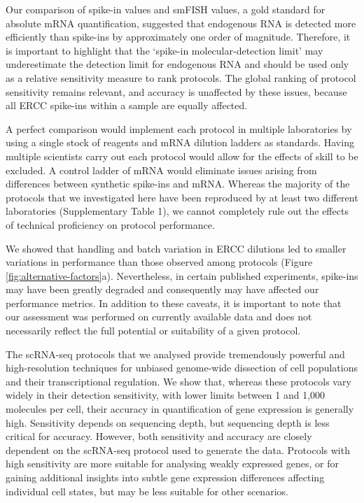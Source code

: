 Our comparison of spike-in values and smFISH values, a gold standard for absolute mRNA quantification, suggested that endogenous RNA is detected more efficiently than spike-ins by approximately one order of magnitude. Therefore, it is important to highlight that the ‘spike-in molecular-detection limit’ may underestimate the detection limit for endogenous RNA and should be used only as a relative sensitivity measure to rank protocols. The global ranking of protocol sensitivity remains relevant, and accuracy is unaffected by these issues, because all ERCC spike-ins within a sample are equally affected.

A perfect comparison would implement each protocol in multiple laboratories by using a single stock of reagents and mRNA dilution ladders as standards. Having multiple scientists carry out each protocol would allow for the effects of skill to be excluded. A control ladder of mRNA would eliminate issues arising from differences between synthetic spike-ins and mRNA. Whereas the majority of the protocols that we investigated here have been reproduced by at least two different laboratories (Supplementary Table 1), we cannot completely rule out the effects of technical proficiency on protocol performance.

We showed that handling and batch variation in ERCC dilutions led to smaller variations in performance than those observed among protocols (Figure \ref{fig:alternative-factors}a). Nevertheless, in certain published experiments, spike-ins may have been greatly degraded and consequently may have affected our performance metrics. In addition to these caveats, it is important to note that our assessment was performed on currently available data and does not necessarily reflect the full potential or suitability of a given protocol.

The scRNA-seq protocols that we analysed provide tremendously powerful and high-resolution techniques for unbiased genome-wide dissection of cell populations and their transcriptional regulation. We show that, whereas these protocols vary widely in their detection sensitivity, with lower limits between 1 and 1,000 molecules per cell, their accuracy in quantification of gene expression is generally high. Sensitivity depends on sequencing depth, but sequencing depth is less critical for accuracy. However, both sensitivity and accuracy are closely dependent on the scRNA-seq protocol used to generate the data. Protocols with high sensitivity are more suitable for analysing weakly expressed genes, or for gaining additional insights into subtle gene expression differences affecting individual cell states, but may be less suitable for other scenarios.

